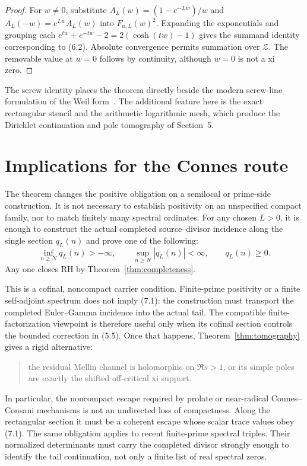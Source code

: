 \documentclass[11pt]{article}
\newcommand{\cZ}{\mathcal Z}
\begin{document}
\begin{proof}
For $w\ne0$, substitute $A_L(w)=(1-e^{-Lw})/w$ and
$A_L(-w)=e^{Lw}A_L(w)$ into $F_{a,L}(w)^2$.  Expanding the exponentials and grouping each
$e^{tw}+e^{-tw}-2=2(\cosh(tw)-1)$ gives the summand identity corresponding to (6.2).
Absolute convergence permits summation over $\cZ$.  The removable value at $w=0$ follows by
continuity, although $w=0$ is not a xi zero.
\end{proof}

The screw identity places the theorem directly beside the modern screw-line formulation of the
Weil form~\cite{Suzuki2023,Suzuki2025,Suzuki2026}.  The additional feature here is the exact
rectangular stencil and the arithmetic logarithmic mesh, which produce the Dirichlet continuation
and pole tomography of Section~5.

\section{Implications for the Connes route}

The theorem changes the positive obligation on a semilocal or prime-side construction.  It is not
necessary to establish positivity on an unspecified compact family, nor to match finitely many
spectral ordinates.  For any chosen $L>0$, it is enough to construct the actual completed
source--divisor incidence along the single section $q_L(n)$ and prove one of the following:
\[
  \inf_{n\ge N}q_L(n)>-\infty,
  \qquad
  \sup_{n\ge N}|q_L(n)|<\infty,
  \qquad
  q_L(n)\ge0.
  \tag{7.1}
\]
Any one closes RH by Theorem~\ref{thm:completeness}.

This is a cofinal, noncompact carrier condition.  Finite-prime positivity or a finite
self-adjoint spectrum does not imply (7.1): the construction must transport the completed
Euler--Gamma incidence into the actual tail.  The compatible finite-factorization viewpoint is
therefore useful only when its cofinal section controls the bounded correction in (5.5).  Once
that happens, Theorem~\ref{thm:tomography} gives a rigid alternative:

\begin{quote}
the residual Mellin channel is holomorphic on $\Re s>1$, or its simple poles are exactly the
shifted off-critical xi support.
\end{quote}

In particular, the noncompact escape required by prolate or near-radical Connes--Consani
mechanisms is not an undirected loss of compactness.  Along the rectangular section it must be a
coherent escape whose scalar trace values obey (7.1).  The same obligation applies to recent
finite-prime spectral triples.  Their normalized determinants must carry the completed divisor
strongly enough to identify the tail continuation, not only a finite list of real spectral zeros.
\end{document}
